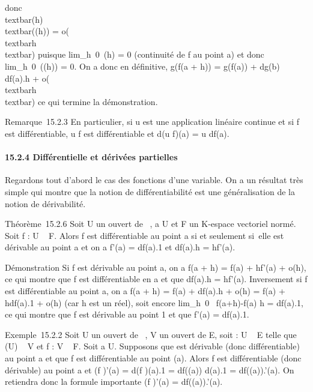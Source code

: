 \documentclass[]{article}
\begin{document}
donc \\textbar{}\phi(h)\\textbar{}\eta(\phi(h)) =
o(\\textbar{}h\\textbar{}) puisque
lim\_h\rightarrow~0~\phi(h) = 0 (continuité de f au
point a) et donc lim\_h\rightarrow~0~\eta(\phi(h)) = 0.
On a donc en définitive, g(f(a + h)) = g(f(a)) + dg(b) \cdot df(a).h +
o(\\textbar{}h\\textbar{}) ce qui termine
la démonstration.

Remarque~15.2.3 En particulier, si u est une application linéaire
continue et si f est différentiable, u \cdot f est différentiable et d(u \cdot
f)(a) = u \cdot df(a).

\paragraph{15.2.4 Différentielle et dérivées partielles}

Regardons tout d'abord le cas des fonctions d'une variable. On a un
résultat très simple qui montre que la notion de différentiabilité est
une généralisation de la notion de dérivabilité.

Théorème~15.2.6 Soit U un ouvert de ~, a \in U et F un K-espace vectoriel
normé. Soit f : U \rightarrow~ F. Alors f est différentiable au point a si et
seulement si~elle est dérivable au point a et on a f'(a) = df(a).1 et
df(a).h = hf'(a).

Démonstration Si f est dérivable au point a, on a f(a + h) = f(a) +
hf'(a) + o(h), ce qui montre que f est différentiable en a et que
df(a).h = hf'(a). Inversement si f est différentiable au point a, on a
f(a + h) = f(a) + df(a).h + o(h) = f(a) + hdf(a).1 + o(h) (car h est un
réel), soit encore lim\_h\rightarrow~0~
f(a+h)-f(a) \over h = df(a).1, ce qui montre que f est
dérivable au point 1 et que f'(a) = df(a).1.

Exemple~15.2.2 Soit U un ouvert de ~, V un ouvert de E, soit \phi : U \rightarrow~ E
telle que \phi(U) \subset~ V et f : V \rightarrow~ F. Soit a \in U. Supposons que \phi est
dérivable (donc différentiable) au point a et que f est différentiable
au point \phi(a). Alors f \cdot \phi est différentiable (donc dérivable) au point
a et (f \cdot \phi)'(a) = d(f \cdot \phi)(a).1 = df(\phi(a)) \cdot d\phi(a).1 = df(\phi(a)).\phi'(a).
On retiendra donc la formule importante (f \cdot \phi)'(a) = df(\phi(a)).\phi'(a).
\end{document}
